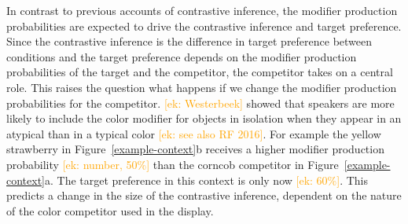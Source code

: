 \documentclass[10pt,letterpaper]{article}
\newcommand{\ek}[1]{\textcolor{Orange}{[ek: #1]}}
\newcommand{\jd}[1]{\textcolor{Purple}{[jd: #1]}}
\begin{document}
In contrast to previous accounts of contrastive inference, the modifier production probabilities are expected to drive the contrastive inference and target preference. Since the contrastive inference is the difference in target preference between conditions and the target preference depends on the modifier production probabilities of the target and the competitor, the competitor takes on a central role. This raises the question what happens if we change the modifier production probabilities for the competitor. \ek{Westerbeek} showed that speakers are more likely to include the color modifier for objects in isolation when they appear in an atypical than in a typical color \ek{see also RF 2016}. For example the yellow strawberry in Figure~\ref{example-context}b receives a higher modifier production probability \ek{number, 50\%} than the corncob competitor in Figure~\ref{example-context}a. The target preference in this context is only now \ek{60\%}. This predicts a change in the size of the contrastive inference, dependent on the nature of the color competitor used in the display.





\end{document}
